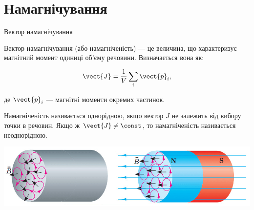 \documentclass[onlytextwidth]{beamer}
\begin{document}
\section{Намагнічування}




\begin{frame}{Вектор намагнічування}{}
	\begin{block}{}
		\alert{Вектор намагнічування} (або \alert{намагніченість}) — це величина, що характеризує магнітний момент одиниці об'єму речовини. Визначається вона
		як:

		\begin{equation*}
			\vect{J} = \frac{1}{V}\sum_i\vect{p}_i,
		\end{equation*}

		де $\vect{p}_i$ --- магнітні моменти окремих частинок.
	\end{block}


	\begin{block}{}\justifying\small
		Намагніченість називається \alert{однорідною}, якщо вектор $J$ не залежить від вибору точки в речовин. Якщо ж $\vect{J}\neq\const$, то
		намагніченість
		називається \alert{неоднорідною}.
	\end{block}
	\begin{center}
		\includegraphics[width=1\linewidth]{AmpereHypotesis}
	\end{center}
\end{frame}
\end{document}
